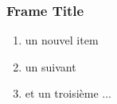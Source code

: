 
\begin{frame}[c]
  \frametitle{Frame Title}



 
 \begin{enumerate}
  \item un \alert{nouvel item}
  \item un suivant
  \item et un troisième ...
 \end{enumerate}




\end{frame}

